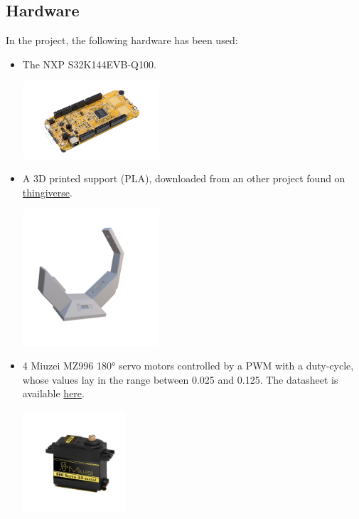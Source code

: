 \documentclass{report}
\begin{document}
\subsection{Hardware}
In the project, the following hardware has been used:
\newline
\begin{itemize}
    \item The NXP S32K144EVB-Q100.

        \begin{center}
        \includegraphics[width=0.4\textwidth]{images/Requirements/s32k_no_bg.png} 
        \end{center}
   
    \item A 3D printed support (PLA), downloaded from an other project found on \href{https://www.thingiverse.com/thing:3826740}{thingiverse}.

        \begin{center}
        \includegraphics[width=0.4\textwidth]{images/Requirements/supporto_3D_noBg.jpg} 
        \end{center}

     \item 4 Miuzei MZ996 180° servo motors controlled by a PWM with a duty-cycle, whose values lay in the range between 0.025 and 0.125. The datasheet is available \href{https://www.electronicoscaldas.com/datasheet/MG996R_Tower-Pro.pdf?srsltid=AfmBOor49yoIi3HG1Glu8xAof5r7fDnHv_RtM06DaJG2pPgA_Chr45Gq}{here}.

        \begin{center}
        \includegraphics[width=0.3\textwidth]{images/Requirements/servo_motor_no_bg.jpg} 
        \end{center}


\end{itemize}
\end{document}
